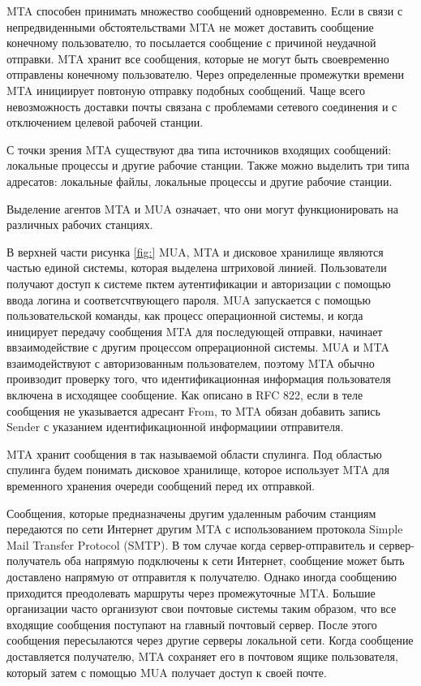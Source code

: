 MTA способен принимать множество сообщений одновременно. Если в связи с непредвиденными обстоятельствами MTA не может доставить сообщение конечному пользователю, то посылается сообщение с причиной неудачной отправки. MTA хранит все сообщения, которые не могут быть своевременно отправлены конечному пользователю. Через определенные промежутки времени MTA инициирует повтоную отправку подобных сообщений. Чаще всего невозможность доставки почты связана с проблемами сетевого соединения и с отключением целевой рабочей станции.

С точки зрения MTA существуют два типа источников входящих сообщений: локальные процессы и другие рабочие станции. Также можно выделить три типа адресатов: локальные файлы, локальные процессы и другие рабочие станции.

Выделение агентов MTA и MUA означает, что они могут функционировать на различных рабочих станциях.

В верхней части рисунка \ref{fig:} MUA, MTA и дисковое хранилище являются частью единой системы, которая выделена штриховой линией. Пользователи получают доступ к системе пктем аутентификации и авторизации с помощью ввода логина и соответсчтвующего пароля. MUA запускается с помощью пользовательской команды, как процесс операционной системы, и когда иницирует передачу сообщения MTA для последующей отправки, начинает ввзаимодействие с другим процессом опрерационной системы. MUA и MTA взаимодействуют с авторизованным пользователем, поэтому MTA обычно проивзодит проверку того, что идентификационная информация пользователя включена в исходящее сообщение. Как описано в RFC 822, если в теле сообщения не указывается адресант From, то MTA обязан добавить запись Sender с указанием идентификационной информациии отправителя.

MTA хранит сообщения в так называемой области спулинга. Под областью спулинга будем понимать дисковое хранилище, которое использует MTA для временного хранения очереди сообщений перед их отправкой.

Сообщения, которые предназначены другим удаленным рабочим станциям передаются по сети Интернет другим MTA с использованием протокола Simple Mail Transfer Protocol (SMTP). В том случае когда сервер-отправитель и сервер-получатель оба напрямую подключены к сети Интернет, сообщение может быть доставлено напрямую от отправитля к получателю. Однако иногда сообщению приходится преодолевать маршруты через промежуточные MTA. Большие организации часто организуют свои почтовые системы таким образом, что все входящие сообщения поступают на главный почтовый сервер. После этого сообщения пересылаются через другие серверы локальной сети. Когда сообщение доставляется получателю, MTA сохраняет его в почтовом ящике пользователя, который затем с помощью MUA получает доступ к своей почте.

